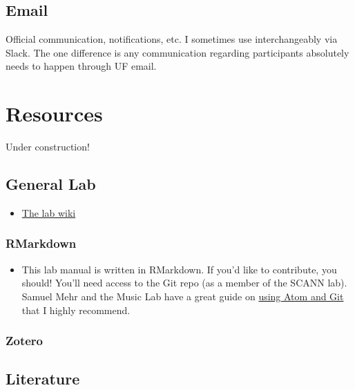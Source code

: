 \documentclass[
  12pt,
]{book}
\providecommand{\tightlist}{%
  \setlength{\itemsep}{0pt}\setlength{\parskip}{0pt}}
\begin{document}
\hypertarget{email}{%
\section{Email}\label{email}}

Official communication, notifications, etc. I sometimes use interchangeably via Slack. The one difference is any communication regarding participants absolutely needs to happen through UF email.

\hypertarget{resources}{%
\chapter{Resources}\label{resources}}

Under construction!

\hypertarget{general-lab}{%
\section{General Lab}\label{general-lab}}

\begin{itemize}
\tightlist
\item
  \href{https://osf.io/d8ke4/wiki/home/}{The lab wiki}
\end{itemize}

\hypertarget{rmarkdown}{%
\subsection{RMarkdown}\label{rmarkdown}}

\begin{itemize}
\tightlist
\item
  This lab manual is written in RMarkdown. If you'd like to contribute, you should! You'll need access to the Git repo (as a member of the SCANN lab). Samuel Mehr and the Music Lab have a great guide on \href{https://handbook-public.themusiclab.org/themusiclab.org/using-atom-and-git}{using Atom and Git} that I highly recommend.
\end{itemize}

\hypertarget{zotero}{%
\subsection{Zotero}\label{zotero}}

\hypertarget{literature}{%
\section{Literature}\label{literature}}
\end{document}

